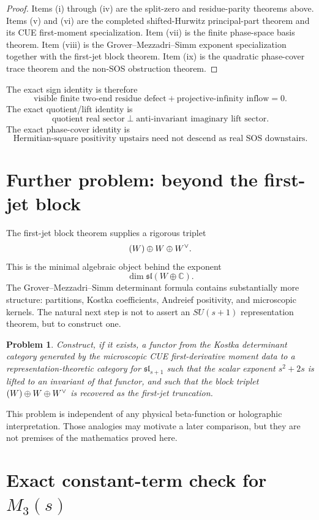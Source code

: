 \documentclass[11pt]{article}
\newtheorem{problem}[theorem]{Problem}
\let\End\relax
\DeclareMathOperator{\End}{End}
\newcommand{\C}{\mathbb C}
\begin{document}
\begin{proof}
Items (i) through (iv) are the split-zero and residue-parity theorems above.  Items
(v) and (vi) are the completed shifted-Hurwitz principal-part theorem and its CUE
first-moment specialization.  Item (vii) is the finite phase-space basis theorem.  Item
(viii) is the Grover--Mezzadri--Simm exponent specialization together with the
first-jet block theorem.  Item (ix) is the quadratic phase-cover trace theorem and the
non-SOS obstruction theorem.
\end{proof}

The exact sign identity is therefore
\[
\boxed{\text{visible finite two-end residue defect}+\text{projective-infinity inflow}=0.}
\]
The exact quotient/lift identity is
\[
\boxed{\text{quotient real sector}\perp\text{anti-invariant imaginary lift sector}.}
\]
The exact phase-cover identity is
\[
\boxed{\text{Hermitian-square positivity upstairs need not descend as real SOS downstairs}.}
\]

\section{Further problem: beyond the first-jet block}

The first-jet block theorem supplies a rigorous triplet
\[
\End(W)\oplus W\oplus W^\vee.
\]
This is the minimal algebraic object behind the exponent
\[
\dim\mathfrak{sl}(W\oplus\C).
\]
The Grover--Mezzadri--Simm determinant formula contains substantially more structure:
partitions, Kostka coefficients, Andreief positivity, and microscopic kernels.  The natural
next step is not to assert an $SU(s+1)$ representation theorem, but to construct one.

\begin{problem}
Construct, if it exists, a functor from the Kostka determinant category generated by the
microscopic CUE first-derivative moment data to a representation-theoretic category for
$\mathfrak{sl}_{s+1}$ such that the scalar exponent $s^2+2s$ is lifted to an invariant of
that functor, and such that the block triplet
$\End(W)\oplus W\oplus W^\vee$ is recovered as the first-jet truncation.
\end{problem}

This problem is independent of any physical beta-function or holographic interpretation.
Those analogies may motivate a later comparison, but they are not premises of the
mathematics proved here.

\appendix
\section{Exact constant-term check for $M_3(s)$}\label{app:script}
\end{document}
